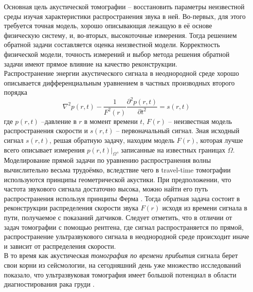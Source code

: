 \documentclass[14pt]{matmex-diploma}
\begin{document}
Основная цель акустической томографии -- восстановить параметры неизвестной среды изучая характеристики распространения звука в ней. Во-первых, для этого требуется точная модель, хорошо описывающая лежащую в её основе физическую систему, и, во-вторых, высокоточные измерения. Тогда решением обратной задачи составляется оценка неизвестной модели. Корректность физической модели, точность измерений и выбор метода решения обратной задачи имеют прямое влияние на качество реконструкции. \\
Распространение энергии акустического сигнала в неоднородной среде хорошо описывается дифференциальным уравнением в частных производных второго порядка 
$$\nabla^2p(r,t) - \frac{1}{F^2(r)}\frac{\partial^2p(r,t)}{\partial t^2} = s(r,t)$$
где $p(r, t)$ --давление в $r$ в момент времени $t$, $F(r)$ -- неизвестная модель распространения скорости и $s(r,t)$ -- первоначальный сигнал. Зная исходный сигнал $s(r, t)$, решая обратную задачу, находим модель $F(r)$, которая лучше всего описывает измерения $p(r,t)|_{\Omega}$, записанные на известных границах $\Omega$.\\
Моделирование прямой задачи по уравнению распространения волны вычислительно весьма трудоёмко, вследствие чего в travel-time томографии используются принципы геометрической акустики. При предположении, что частота звукового сигнала достаточно высока, можно найти его путь распространения используя принципы Ферма \cite{schuster1904introduction}. Тогда обратная задача состоит в реконструкции распределения скорости звука $F(r)$ исходя из времени сигнала в пути, получаемое с показаний датчиков. Следует отметить, что в отличии от задач томографии с помощью рентгена, где сигнал распространяется по прямой, распространение ультразвукового сигнала в неоднородной среде происходит иначе и зависит от распределения скорости.\\
В то время как акустическая \textit{томография по времени прибытия} сигнала берет свои корни из сейсмологии\cite{dines1979computerized}, на сегодняшний день уже множество исследований показало, что ультразвуковая томография имеет большой потенциал в области диагностирования рака груди \cite{duric2007detection}. \\
\end{document}
